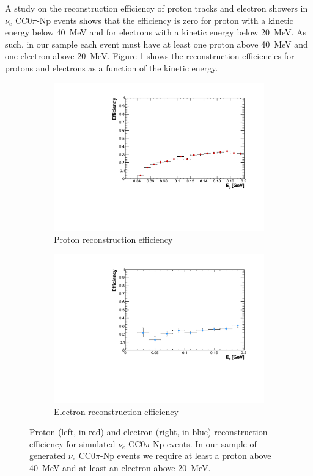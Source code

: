 \documentclass[a4paper]{article}
\begin{document}
A study on the reconstruction efficiency of proton tracks and electron showers in $\nu_{e}$ CC$0\pi$-Np events shows that the efficiency is zero for proton with a kinetic energy below 40~MeV and for electrons with a kinetic energy below 20~MeV. As such, in our sample each event must have at least one proton above 40~MeV and one electron above 20~MeV. Figure \ref{fig:kin_eff} shows the reconstruction efficiencies for protons and electrons as a function of the kinetic energy.

\begin{figure}[htbp]
  \begin{subfigure}{0.48\textwidth}
    \includegraphics[width=\linewidth]{figures/proton_eff.pdf}
    \caption{Proton reconstruction efficiency} 
  \end{subfigure}
    \begin{subfigure}{0.48\textwidth}
    \includegraphics[width=\linewidth]{figures/electron_eff.pdf}
    \caption{Electron reconstruction efficiency} 
  \end{subfigure}
  \caption{Proton (left, in red) and electron (right, in blue) reconstruction efficiency for simulated $\nu_{e}$ CC$0\pi$-Np events. In our sample of generated $\nu_{e}$ CC$0\pi$-Np events we require at least a proton above 40~MeV and at least an electron above 20~MeV.}
  \label{fig:kin_eff}
\end{figure}
\end{document}
